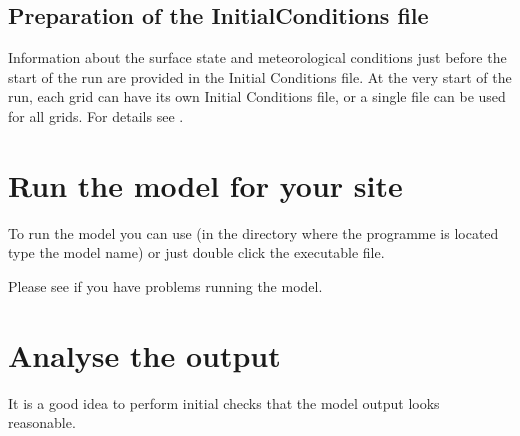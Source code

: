 \documentclass[letterpaper,10pt,english]{sphinxmanual}
\begin{document}
\subsection{Preparation of the InitialConditions file}
\label{\detokenize{prepare-to-run-the-model:preparation-of-the-initialconditions-file}}
Information about the surface state and meteorological conditions just
before the start of the run are provided in the Initial Conditions file.
At the very start of the run, each grid can have its own Initial
Conditions file, or a single file can be used for all grids. For details
see {\hyperref[\detokenize{input_files/Initial_Conditions/Initial_Conditions:initial-conditions}]{}}.


\section{Run the model for your site}
\label{\detokenize{prepare-to-run-the-model:run-the-model-for-your-site}}
To run the model you can use  (in the directory where
the programme is located type the model name) or just double click the
executable file.

Please see {\hyperref[\detokenize{troubleshooting:troubleshooting}]{}} if you have problems
running the model.


\section{Analyse the output}
\label{\detokenize{prepare-to-run-the-model:analyse-the-output}}
It is a good idea to perform initial checks that the model output looks
reasonable.
\end{document}
